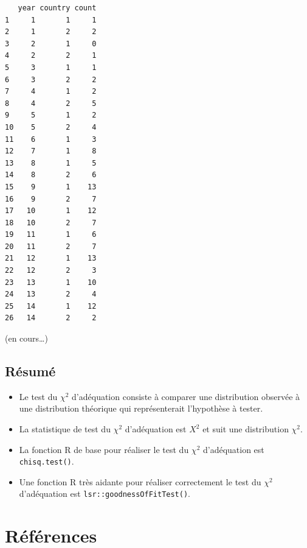 \documentclass[
  letterpaper,
]{book}
\providecommand{\tightlist}{%
  \setlength{\itemsep}{0pt}\setlength{\parskip}{0pt}}\usepackage{longtable,booktabs,array}
\begin{document}
\begin{verbatim}
   year country count
1     1       1     1
2     1       2     2
3     2       1     0
4     2       2     1
5     3       1     1
6     3       2     2
7     4       1     2
8     4       2     5
9     5       1     2
10    5       2     4
11    6       1     3
12    7       1     8
13    8       1     5
14    8       2     6
15    9       1    13
16    9       2     7
17   10       1    12
18   10       2     7
19   11       1     6
20   11       2     7
21   12       1    13
22   12       2     3
23   13       1    10
24   13       2     4
25   14       1    12
26   14       2     2
\end{verbatim}

(en cours\ldots)

\section{Résumé}\label{ruxe9sumuxe9-6}

\begin{itemize}
\tightlist
\item
  Le test du \(\chi^2\) d'adéquation consiste à comparer une
  distribution observée à une distribution théorique qui représenterait
  l'hypothèse à tester.
\item
  La statistique de test du \(\chi^2\) d'adéquation est \(X^2\) et suit
  une distribution \(\chi^2\).
\item
  La fonction R de base pour réaliser le test du \(\chi^2\) d'adéquation
  est \texttt{chisq.test()}.
\item
  Une fonction R très aidante pour réaliser correctement le test du
  \(\chi^2\) d'adéquation est \texttt{lsr::goodnessOfFitTest()}.
\end{itemize}


\chapter*{Références}\label{ruxe9fuxe9rences}

\end{document}
